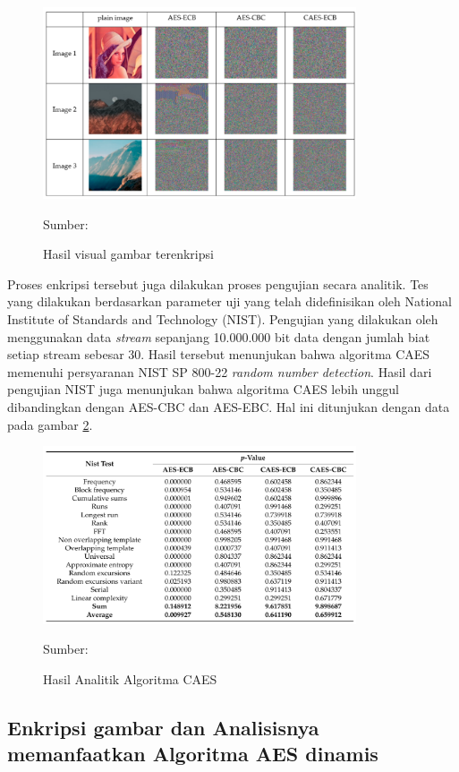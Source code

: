 \begin{figure}[!h]
  \centering
  \includegraphics[width=350px]{chapters/res/chapter-2/img/lin.res.png}
  \caption{Hasil visual gambar terenkripsi} \label{fig:lin.result}
  Sumber: \textcite{lin2021}
\end{figure}

Proses enkripsi tersebut juga dilakukan proses pengujian secara analitik. Tes yang dilakukan berdasarkan parameter uji yang telah didefinisikan oleh National Institute of Standards and Technology (NIST). Pengujian yang dilakukan oleh \textcite{lin2021} menggunakan data \emph{stream} sepanjang 10.000.000 bit data dengan jumlah biat setiap stream sebesar 30. Hasil tersebut menunjukan bahwa algoritma CAES memenuhi persyaranan NIST SP 800-22 \emph{random number detection}. Hasil dari pengujian NIST juga menunjukan bahwa algoritma CAES lebih unggul dibandingkan dengan AES-CBC dan AES-EBC. Hal ini ditunjukan dengan data pada gambar \ref{fig:lin.analytic-result}.

\begin{figure}[!h]
  \centering
  \includegraphics[width=350px]{chapters/res/chapter-2/img/lin.analytic-test.png}
  \caption{Hasil Analitik Algoritma CAES} \label{fig:lin.analytic-result}
  Sumber: \textcite{lin2021}
\end{figure}

\subsection{Enkripsi gambar dan Analisisnya memanfaatkan Algoritma AES dinamis}

